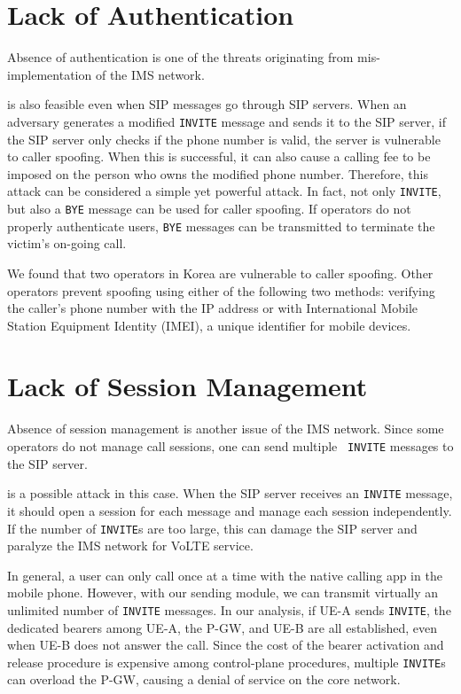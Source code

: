 \section{Lack of Authentication}
Absence of authentication is one of the threats originating from
mis-implementation of the IMS network.

 is also feasible even when SIP messages go through SIP
servers. When an adversary generates a modified {\tt INVITE} message and sends it to the
SIP server, if the SIP server only checks if the phone number is valid, the
server is vulnerable to caller spoofing.  When this is successful, it can
also cause a calling fee to be imposed on the person who owns the modified phone number.
Therefore, this attack can be considered a simple yet powerful attack. In fact, not 
only {\tt INVITE}, but also a {\tt BYE} message can be used for caller spoofing.  
If operators do not properly authenticate users, {\tt BYE} messages can be transmitted
to terminate the victim's on-going call. 

We found that two operators in Korea are vulnerable to caller
spoofing. Other operators prevent spoofing using either of the
following two methods: verifying the caller's phone number with the IP
address or with International Mobile Station Equipment Identity (IMEI),
a unique identifier for mobile
devices.


\section{Lack of Session Management}
Absence of session management is another issue of the IMS network. Since some
operators do not manage call sessions, one can send multiple {\tt
INVITE} messages to the SIP server.

 is a possible attack in
this case.  When the SIP server receives an {\tt INVITE} message, it
should open a session for each message and manage each session
independently. If the number of {\tt INVITE}s are too large, this can
damage the SIP server and paralyze the IMS network for VoLTE service.

In general, a user can only call once at a time with the native
calling app in the mobile phone. However, with our sending module, we
can transmit virtually an unlimited number of {\tt INVITE} messages.  In
our analysis, if UE-A sends {\tt INVITE}, the dedicated bearers among
UE-A, the P-GW, and UE-B are all established, even when UE-B
does not answer the call. Since the cost of the bearer activation and
release procedure is expensive among control-plane procedures,
multiple {\tt INVITE}s can overload the P-GW, causing a denial of service 
on the core network.

